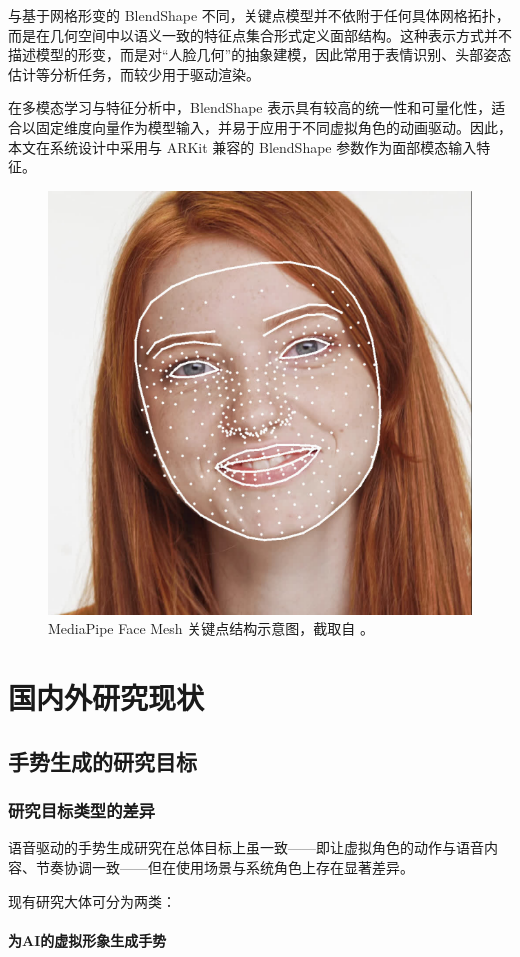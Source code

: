与基于网格形变的 BlendShape 不同，关键点模型并不依附于任何具体网格拓扑，而是在几何空间中以语义一致的特征点集合形式定义面部结构。这种表示方式并不描述模型的形变，而是对“人脸几何”的抽象建模，因此常用于表情识别、头部姿态估计等分析任务，而较少用于驱动渲染。

在多模态学习与特征分析中，BlendShape 表示具有较高的统一性和可量化性，适合以固定维度向量作为模型输入，并易于应用于不同虚拟角色的动画驱动。因此，本文在系统设计中采用与 ARKit 兼容的 BlendShape 参数作为面部模态输入特征。

\begin{figure}[h!t]
\centering
\includegraphics[width=0.4\linewidth]{figures/Fig_MediaPipeLandmark.png}
\caption{MediaPipe Face Mesh 关键点结构示意图，截取自 \cite{mediapipefacemesh}。}
\label{fig_mediapipe_landmark}
\end{figure}

\section{国内外研究现状}

\subsection{手势生成的研究目标}

\subsubsection{研究目标类型的差异}

语音驱动的手势生成研究在总体目标上虽一致——即让虚拟角色的动作与语音内容、节奏协调一致——但在使用场景与系统角色上存在显著差异。

现有研究大体可分为两类：

\paragraph{为AI的虚拟形象生成手势}

